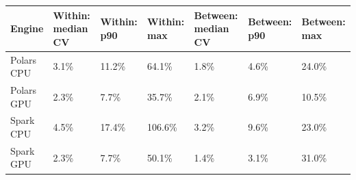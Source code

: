 \begin{tabular}{lllllll}
\toprule
Engine & Within: median CV & Within: p90 & Within: max & Between: median CV & Between: p90 & Between: max \\
\midrule
Polars CPU & 3.1\% & 11.2\% & 64.1\% & 1.8\% & 4.6\% & 24.0\% \\
Polars GPU & 2.3\% & 7.7\% & 35.7\% & 2.1\% & 6.9\% & 10.5\% \\
Spark CPU & 4.5\% & 17.4\% & 106.6\% & 3.2\% & 9.6\% & 23.0\% \\
Spark GPU & 2.3\% & 7.7\% & 50.1\% & 1.4\% & 3.1\% & 31.0\% \\
\bottomrule
\end{tabular}
